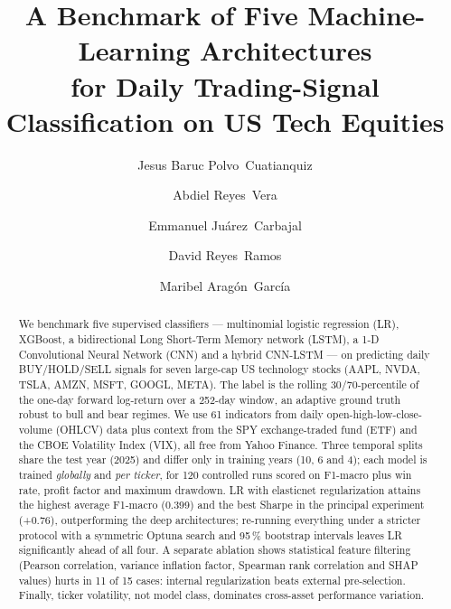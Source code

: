 \documentclass[runningheads]{llncs}
\begin{document}
\title{A Benchmark of Five Machine-Learning Architectures \\for Daily Trading-Signal Classification on US Tech Equities}


\author{Jesus Baruc Polvo~Cuatianquiz \and
Abdiel Reyes~Vera \and
Emmanuel Ju\'arez~Carbajal \and
David Reyes~Ramos \and
Maribel Arag\'on~Garc\'ia}



\maketitle

\begin{abstract}
We benchmark five supervised classifiers --- multinomial logistic regression (LR), XGBoost, a bidirectional Long Short-Term Memory network (LSTM), a 1-D Convolutional Neural Network (CNN) and a hybrid CNN-LSTM --- on predicting daily BUY/HOLD/SELL signals for seven large-cap US technology stocks (AAPL, NVDA, TSLA, AMZN, MSFT, GOOGL, META). The label is the rolling 30/70-percentile of the one-day forward log-return over a 252-day window, an adaptive ground truth robust to bull and bear regimes. We use 61 indicators from daily open-high-low-close-volume (OHLCV) data plus context from the SPY exchange-traded fund (ETF) and the CBOE Volatility Index (VIX), all free from Yahoo Finance. Three temporal splits share the test year (2025) and differ only in training years (10, 6 and 4); each model is trained \emph{globally} and \emph{per ticker}, for 120 controlled runs scored on F1-macro plus win rate, profit factor and maximum drawdown. LR with elasticnet regularization attains the highest average F1-macro (0.399) and the best Sharpe in the principal experiment (+0.76), outperforming the deep architectures; re-running everything under a stricter protocol with a symmetric Optuna search and 95\,\% bootstrap intervals leaves LR significantly ahead of all four. A separate ablation shows statistical feature filtering (Pearson correlation, variance inflation factor, Spearman rank correlation and SHAP values) hurts in 11 of 15 cases: internal regularization beats external pre-selection. Finally, ticker volatility, not model class, dominates cross-asset performance variation.
\end{abstract}
\end{document}
